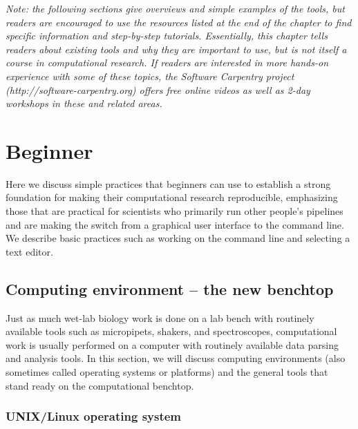\documentclass[ChapterTOCs,krantz2]{krantz} %
\newcommand{\unix}{UNIX}
\begin{document}
\textsl{Note: the following sections give overviews and simple examples of the tools, 
but readers are encouraged to use the resources listed at the end of
the chapter to find specific information and step-by-step tutorials.  Essentially, 
this chapter tells readers about existing tools and why they are important to use, 
but is not itself a course in computational research.  If readers are interested in more hands-on experience with some of these topics, the Software Carpentry project (http://software-carpentry.org) offers free online videos as well as 2-day workshops in these and related areas.}

\section{Beginner} Here we discuss simple practices that beginners can use
to establish a strong foundation for making their computational research
reproducible, emphasizing those that are practical for scientists who primarily
run other people's pipelines and are making the switch from a graphical user
interface to the command line. We describe basic practices such as working
on the command line and selecting a text editor.  

\subsection{Computing environment -- the new benchtop}

Just as much wet-lab biology work is done on a lab bench with routinely available tools
such as micropipets, shakers, and spectroscopes, computational work
is usually performed on a computer with routinely available data parsing and analysis tools.  
In this section, we will discuss computing environments (also
sometimes called operating systems or platforms) and the general tools that
stand ready on the computational benchtop.  

\subsubsection{\unix{}/Linux operating system}
\end{document}
